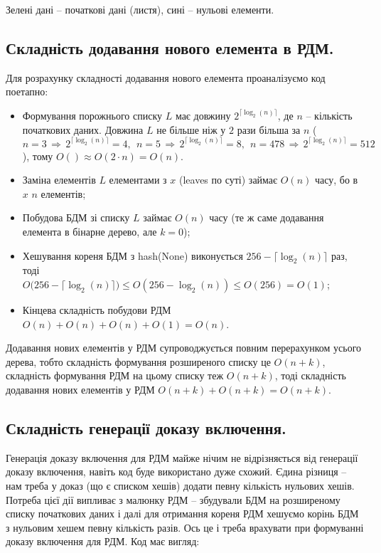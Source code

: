 \documentclass[a4paper, 12pt]{article}
\begin{document}
\par Зелені дані -- початкові дані (листя), сині -- нульові елементи.

\subsection{Складність додавання нового елемента в РДМ.}

\par Для розрахунку складності додавання нового елемента проаналізуємо код поетапно:

\begin{itemize}
	\item Формування порожнього списку $L$ має довжину $2^{\lceil \log_2(n) \rceil}$, де $n$ -- кількість початкових даних. Довжина $L$ не більше ніж у $2$ рази більша за $n$ ($n = 3 \, \Rightarrow \, 2^{\lceil \log_2(n) \rceil}  = 4, \ \ n = 5 \, \Rightarrow \, 2^{\lceil \log_2(n) \rceil} = 8, \ \ n = 478 \, \Rightarrow \, 2^{\lceil \log_2(n) \rceil}  = 512$), тому $O() \approx O(2 \cdot n) = O(n)$.
	\item Заміна елементів $L$ елементами з $x$ (leaves по суті) займає $O(n)$ часу, бо в $x$ $n$ елементів;
	\item Побудова БДМ зі списку $L$ займає $O(n)$ часу (те ж саме додавання елемента в бінарне дерево, але $k = 0$);
	\item Хешування кореня БДМ з hash(None) виконується $256 - \lceil \log_2(n) \rceil$ раз, тоді \\ $O\big(256 - \lceil \log_2(n) \rceil\big) \le O(256 - \log_2(n)) \le O(256) = O(1)$;
	\item Кінцева складність побудови РДМ $O(n) + O(n) + O(n) + O(1) = O(n)$.
\end{itemize}
\par Додавання нових елементів у РДМ супроводжується повним перерахунком усього дерева, тобто складність формування розширеного списку це $O(n + k)$, складність формування РДМ на цьому списку теж $O(n + k)$, тоді складність додавання нових елементів у РДМ $O(n + k) + O(n + k) = O(n + k)$.

\subsection{Складність генерації доказу включення.}

\par Генерація доказу включення для РДМ майже нічим не відрізняється від генерації доказу включення, навіть код буде використано дуже схожий. Єдина різниця -- нам треба у доказ (що є списком хешів) додати певну кількість нульових хешів. Потреба цієї дії випливає з малюнку РДМ -- збудували БДМ на розширеному списку початкових даних і далі для отримання кореня РДМ хешуємо корінь БДМ з нульовим хешем певну кількість разів. Ось це і треба врахувати при формуванні доказу включення для РДМ. Код має вигляд:
\end{document}
